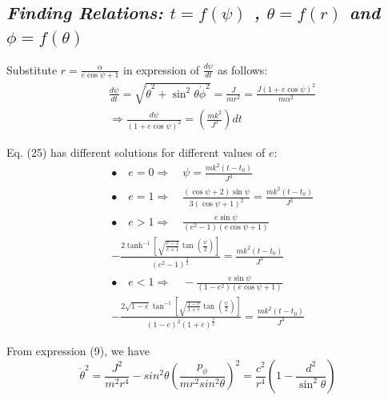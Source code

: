 \documentclass[conference]{IEEEtran}
\begin{document}
\subsection{\normalsize{\emph{\textbf{Finding Relations: $t = f(\psi)$ , $\theta = f(r)$ and $\phi = f(\theta)$}}}}
Substitute $r = \frac{\alpha}{e\cos{\psi}+1}$ in expression of $\frac{d \psi}{d t}$ as follows: \begin{equation}
\begin{split}
&\frac{d \psi}{d t} = \sqrt{\dot{\theta}^{2} + \sin^{2}{\theta}\dot{\phi}^{2}} = \frac{J}{mr^{2}} = \frac{J\left(1 + e\cos{\psi}\right)^{2}}{m\alpha^{2}} \\
&\Rightarrow \frac{d \psi}{\left(1 + e\cos{\psi}\right)^{2}} = \left(\frac{mk^{2}}{J^{3}}\right) dt 
\end{split}
\end{equation}

Eq. (25) has different solutions for different values of $e$: 
\begin{equation}
\begin{split}
&\bullet \quad e=0 \Rightarrow \quad \psi = \frac{m k^{2}\left(t - t_{0}\right)}{J^{3}} \\
&\bullet \quad e=1 \Rightarrow \quad \frac{\left(\cos{\psi}+2\right)\sin{\psi}}{3\left(\cos{\psi}+1\right)^{2}} = \frac{m k^{2}\left(t - t_{0}\right)}{J^{3}} \\
&\bullet \quad e>1 \Rightarrow \quad \frac{e\sin{\psi}}{\left(e^{2}-1\right)\left(e\cos{\psi} +1\right)} \\
&-\frac{2\tanh^{-1}{\left[\sqrt{\frac{e-1}{e+1}}\tan{\left(\frac{\psi}{2}\right)}\right]}}{\left(e^{2}-1\right)^{\frac{3}{2}}} =\frac{m k^{2}\left(t - t_{0}\right)}{J^{3}}\\
&\bullet \quad e <1 \Rightarrow \quad -\frac{e\sin{\psi}}{\left(1 - e^{2}\right)\left(e\cos{\psi} +1\right)} \\
&-\frac{2\sqrt{1-e}\tan^{-1}{\left[\sqrt{\frac{1-e}{1+e}}\tan{\left(\frac{\psi}{2}\right)}\right]}}{\left(1-e\right)^{2}\left(1+e\right)^{\frac{3}{2}}} =\frac{m k^{2}\left(t - t_{0}\right)}{J^{3}}
\end{split}
\end{equation}

From expression (9), we have \begin{dmath}\dot{\theta}^{2} =  \frac{J^2}{m^{2}r^{4}} - sin^{2}{\theta}\left(\frac{p_{\phi}}{mr^{2}sin^{2}{\theta}}\right)^{2} = \frac{c^{2}}{r^{4}}\left(1 - \frac{d^{2}}{\sin^{2}{\theta}}\right)\end{dmath} 
\end{document}

